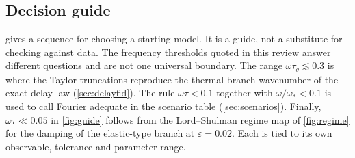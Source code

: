 \subsection{Decision guide}
 gives a sequence for choosing a starting model. It is a guide, not a substitute for checking against data. The frequency thresholds quoted in this review answer different questions and are not one universal boundary. The range $\omega\tau_q\lesssim0.3$ is where the Taylor truncations reproduce the thermal-branch wavenumber of the exact delay law (\cref{sec:delayfid}). The rule $\omega\tau<0.1$ together with $\omega/\omega_*<0.1$ is used to call Fourier adequate in the scenario table (\cref{sec:scenarios}). Finally, $\omega\tau\ll0.05$ in \cref{fig:guide} follows from the Lord--Shulman regime map of \cref{fig:regime} for the damping of the elastic-type branch at $\varepsilon=0.02$. Each is tied to its own observable, tolerance and parameter range.
